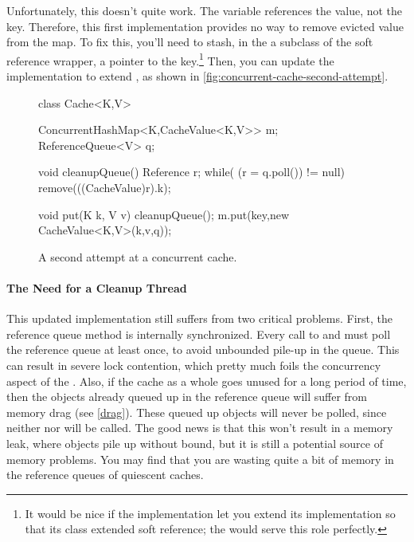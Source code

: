 Unfortunately, this doesn't quite work. The variable  references the
value, not the key. Therefore, this first implementation provides no way to
remove evicted value from the map. To fix this, you'll need to stash, in the a
subclass of the soft reference wrapper, a pointer to the key.\footnote{It would
be nice if the  implementation let you extend its
implementation so that its  class extended soft reference; the
 would serve this role perfectly.} Then, you can update the
 implementation to extend
, as shown in
\autoref{fig:concurrent-cache-second-attempt}.

\begin{wrapfigure}{l}{0.61\textwidth}
\centering
\begin{figurelisting}
class Cache<K,V> {
  ConcurrentHashMap<K,CacheValue<K,V>> m;
  ReferenceQueue<V> q;
   
  void cleanupQueue() {
    Reference r;
    while( (r = q.poll()) != null)
       remove(((CacheValue)r).k);
  }
   
  void put(K k, V v) {
    cleanupQueue();
    m.put(key,new CacheValue<K,V>(k,v,q));
  }
}
\end{figurelisting}
\caption{A second attempt at a concurrent cache.}
\label{fig:concurrent-cache-second-attempt}
\end{wrapfigure}

\paragraph{The Need for a Cleanup Thread}
This updated implementation still suffers from two critical problems. First, the
reference queue  method is internally synchronized. Every call to
 and  must poll the reference queue at least once, to avoid
unbounded pile-up in the queue. This can result in severe lock contention, which
pretty much foils the concurrency aspect of the .
Also, if the cache as a whole goes unused for a long period of time, then the
objects already queued up in the reference queue will suffer from memory drag
(see \autoref{drag}). These queued up objects will never be polled, since
neither  nor  will be called. The good news is that this
won't result in a memory leak, where objects pile up without bound, but it is
still a potential source of memory problems. You may find that you are wasting
quite a bit of memory in the reference queues of quiescent caches.

